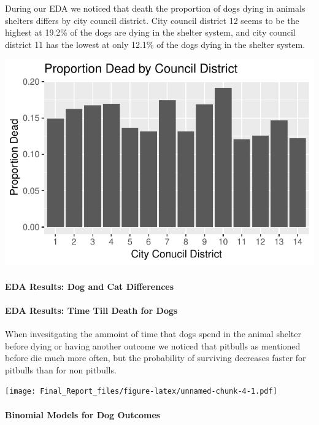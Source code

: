 \documentclass[]{article}
\let\oldparagraph\paragraph
\renewcommand{\paragraph}[1]{\oldparagraph{#1}\mbox{}}
\begin{document}
During our EDA we noticed that death the proportion of dogs dying in
animals shelters differs by city council district. City council district
12 seems to be the highest at 19.2\% of the dogs are dying in the
shelter system, and city council district 11 has the lowest at only
12.1\% of the dogs dying in the shelter system.

\includegraphics{Final_Report_files/figure-latex/unnamed-chunk-2-1.pdf}

\paragraph{EDA Results: Dog and Cat
Differences}\label{eda-results-dog-and-cat-differences}

\paragraph{EDA Results: Time Till Death for
Dogs}\label{eda-results-time-till-death-for-dogs}

When invesitgating the ammoint of time that dogs spend in the animal
shelter before dying or having another outcome we noticed that pitbulls
as mentioned before die much more often, but the probability of
surviving decreases faster for pitbulls than for non pitbulls.

\texttt{[image: Final\_Report\_files/figure-latex/unnamed-chunk-4-1.pdf]}

\paragraph{Binomial Models for Dog
Outcomes}\label{binomial-models-for-dog-outcomes}
\end{document}
